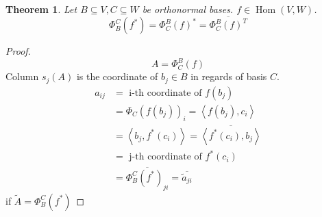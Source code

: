 \documentclass{article}
\newtheorem{theorem}{Theorem}  \numberwithin{theorem}{section}
\newcommand{\ip}[2]{\left\langle#1,#2\right\rangle} %
\begin{document}
\begin{theorem} %
  Let $B \subseteq V, C \subseteq W$ be orthonormal bases. $f \in \operatorname{Hom}(V, W)$.
  \[ \Phi_B^C(f^*) = \Phi_C^B(f)^* = \overline{\Phi_C^B(f)^T} \]
\end{theorem}

\begin{proof}
  \[ A = \Phi_C^B(f) \]
  Column $s_j(A)$ is the coordinate of $b_j \in B$ in regards of basis $C$.
  \begin{align*}
    a_{ij} &= \text{ i-th coordinate of } f(b_j) \\
      &= \Phi_C(f(b_j))_i = \ip{f(b_j)}{c_i} \\
      &= \ip{b_j}{f^*(c_i)} = \overline{\ip{f^*(c_i)}{b_j}} \\
      &= \text{ j-th coordinate of } f^*(c_i) \\
      &= \overline{\Phi_B^C(f^*)_{ji}} = \overline{\tilde{a}_{ji}}
  \end{align*}
  if $\tilde A = \Phi_B^C(f^*)$
\end{proof}
\end{document}
